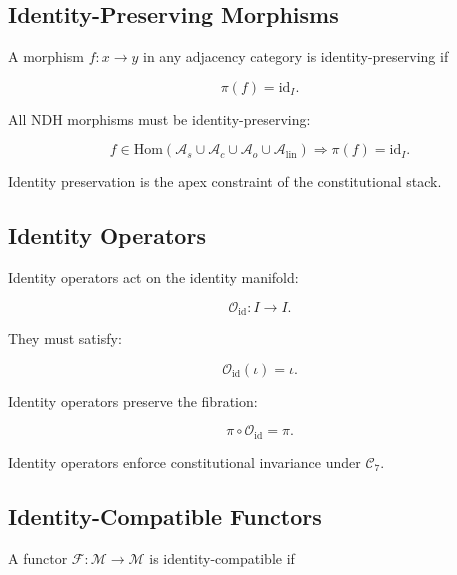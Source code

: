 
\subsection{Identity-Preserving Morphisms}

A morphism $f : x \to y$ in any adjacency category is identity-preserving if

\[
\pi(f) = \mathrm{id}_I.
\]

All NDH morphisms must be identity-preserving:

\[
f \in \mathrm{Hom}(\mathcal{A}_s \cup
                   \mathcal{A}_c \cup
                   \mathcal{A}_o \cup
                   \mathcal{A}_{\mathrm{lin}})
\Rightarrow
\pi(f) = \mathrm{id}_I.
\]

Identity preservation is the apex constraint of the constitutional stack.


\subsection{Identity Operators}

Identity operators act on the identity manifold:

\[
\mathcal{O}_{\mathrm{id}} : I \to I.
\]

They must satisfy:

\[
\mathcal{O}_{\mathrm{id}}(\iota) = \iota.
\]

Identity operators preserve the fibration:

\[
\pi \circ \mathcal{O}_{\mathrm{id}} = \pi.
\]

Identity operators enforce constitutional invariance under $\mathcal{C}_7$.


\subsection{Identity-Compatible Functors}

A functor $\mathcal{F} : \mathcal{M} \to \mathcal{M}$ is identity-compatible
if

